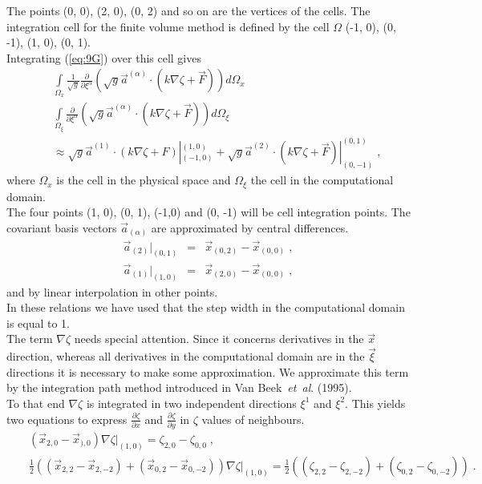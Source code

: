 \documentclass[12pt]{book}
\begin{document}
The points (0, 0), (2, 0), (0, 2) and so on are the vertices of the cells.
The integration cell for the finite volume method is defined by the cell
$\Omega $ (-1, 0), (0, -1), (1, 0), (0, 1).\\[2ex]
Integrating (\ref{eq:9G}) over this cell gives
\begin{eqnarray}
&&\int\limits_{\Omega_{x}} \frac{1}{\sqrt{g}} \frac{\partial}{\partial
\xi^{\alpha}}(\sqrt{g} \vec{a}^{(\alpha)} \cdot (k \nabla \zeta +
\vec{F}))d\Omega_{x}\nonumber\\
&&\int\limits_{\Omega_{\xi}} \frac{\partial}{\partial
\xi^{\alpha}}(\sqrt{g}\vec{a}^{(\alpha)} \cdot (k \nabla \zeta
+ \vec{F}))d\Omega_{\xi}\label{eq:10G}\\
&&\approx \sqrt{g}\vec{a}^{(1)} \cdot (k\nabla \zeta + F)|^{(1,0)}_{(-1,0)}
+ \sqrt{g}\vec{a}^{(2)} \cdot (k \nabla \zeta + \vec{F})|^{(0,1)}_{(0,
-1)}\;,
\nonumber
\end{eqnarray}
where $\Omega_{x}$ is the cell in the physical space and $\Omega_{\xi}$ the
cell in the computational domain.\\
The four points (1, 0), (0, 1), (-1,0) and (0, -1) will be cell integration
points. The covariant basis vectors $\vec{a}_{(\alpha)}$ are approximated by
central differences.
\begin{eqnarray}
\vec{a}_{(2)}|_{(0,1)}&=&\vec{x}_{(0, 2)} - \vec{x}_{(0,0)}\;,\label{eq:11G}\\
\vec{a}_{(1)}|_{(1, 0)}&=&\vec{x}_{(2,0)} - \vec{x}_{(0,0)}\;,\label{eq:12G}
\end{eqnarray}
and by linear interpolation in other points.\\
In these relations we have used that the step width in the computational
domain is equal to 1.\\
The term $\nabla \zeta$ needs special attention. Since it concerns derivatives
in the $\vec{x}$ direction, whereas all derivatives in the computational
domain are in the $\vec{\xi}$ directions it is necessary to make some
approximation. We approximate this term by the integration path method
introduced in Van Beek~{\it et~al}. (1995).\\[2ex]
To that end $\nabla \zeta$ is integrated in two independent directions
$\xi^{1}$ and $\xi^{2}$. This yields two equations to express
$\frac{\partial \zeta}{\partial x}$ and $\frac{\partial \zeta}{\partial y}$ in
$\zeta$ values of neighbours.
\begin{eqnarray}
&&(\vec{x}_{2,0} - \vec{x}_{),0})\nabla \zeta|_{(1, 0)} = \zeta_{2,0} -
\zeta_{0,0}\;,\label{eq:13G}\\
&&\frac{1}{2}((\vec{x}_{2,2} - \vec{x}_{2,-2}) + (\vec{x}_{0,2} -
\vec{x}_{0,-2}))\nabla \zeta|_{(1,0)} = \frac{1}{2}((\zeta_{2,2} -
\zeta_{2,-2}) + (\zeta_{0,2} - \zeta_{0,-2}))\;.\label{eq:14G}
\end{eqnarray}
\end{document}
